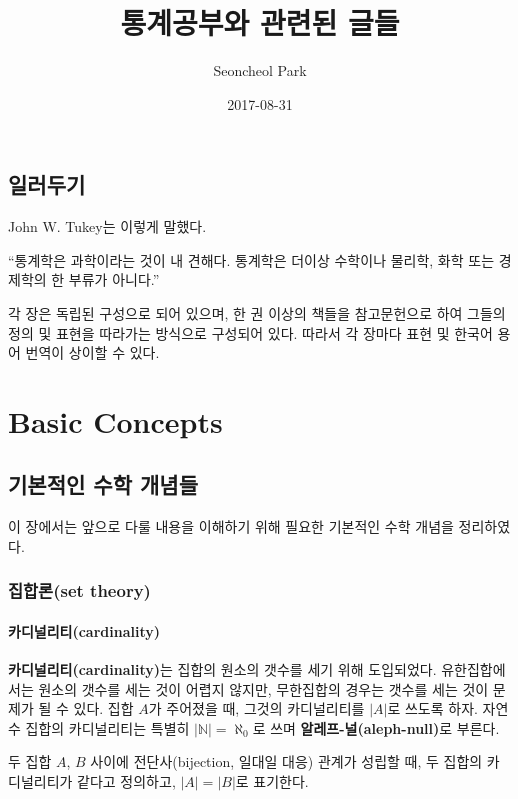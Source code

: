 \documentclass[b5paper,]{book}
\title{통계공부와 관련된 글들}
\author{Seoncheol Park}
\date{2017-08-31}
\theoremstyle{definition}
\theoremstyle{definition}
\theoremstyle{definition}
\theoremstyle{remark}
\let\BeginKnitrBlock\begin \let\EndKnitrBlock\end
\begin{document}
\maketitle

{
\hypersetup{linkcolor=Black}
\setcounter{tocdepth}{2}
\tableofcontents
}
\chapter{일러두기}

John W. Tukey는 이렇게 말했다.

``통계학은 과학이라는 것이 내 견해다. 통계학은 더이상 수학이나 물리학,
화학 또는 경제학의 한 부류가 아니다.''

각 장은 독립된 구성으로 되어 있으며, 한 권 이상의 책들을 참고문헌으로
하여 그들의 정의 및 표현을 따라가는 방식으로 구성되어 있다. 따라서 각
장마다 표현 및 한국어 용어 번역이 상이할 수 있다.

\part{Basic Concepts}\label{part-basic-concepts}

\chapter{기본적인 수학 개념들}\label{math}

이 장에서는 앞으로 다룰 내용을 이해하기 위해 필요한 기본적인 수학 개념을
정리하였다.

\section{집합론(set theory)}\label{set-theory}

\subsection{카디널리티(cardinality)}\label{cardinality}

\textbf{카디널리티(cardinality)}는 집합의 원소의 갯수를 세기 위해
도입되었다. 유한집합에서는 원소의 갯수를 세는 것이 어렵지 않지만,
무한집합의 경우는 갯수를 세는 것이 문제가 될 수 있다. 집합 \(A\)가
주어졌을 때, 그것의 카디널리티를 \(|A|\)로 쓰도록 하자. 자연수 집합의
카디널리티는 특별히 \(|\mathbb{N}|=\aleph_{0}\)로 쓰며
\textbf{알레프-널(aleph-null)}로 부른다.

\BeginKnitrBlock{definition}[카디널리티가 같다]
\protect\hypertarget{def:unnamed-chunk-1}{}{\label{def:unnamed-chunk-1}
{} }두 집합 \(A\), \(B\) 사이에
전단사(bijection, 일대일 대응) 관계가 성립할 때, 두 집합의 카디널리티가
같다고 정의하고, \(|A|=|B|\)로 표기한다.
\EndKnitrBlock{definition}
\end{document}
